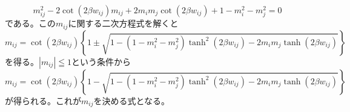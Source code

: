 \begin{equation}
m_{ij}^{2}-2\cot(2\beta w_{ij})m_{ij}+2m_{i}m_{j}\cot(2\beta
w_{ij})+1-m_{i}^2-m_{j}^{2}=0\nonumber
\end{equation}
である。この$m_{ij}$に関する二次方程式を解くと
\begin{equation}
m_{ij}=\cot(2\beta w_{ij})\left\{1\pm
\sqrt{1-(1-m_{i}^{2}-m_{j}^{2})\tanh^{2}(2\beta
w_{ij})-2m_{i}m_{j}\tanh(2\beta w_{ij})}\right\}\label{eq:4.29}
\end{equation}
を得る。$|m_{ij}|\leqq 1$という条件から
\begin{equation}
m_{ij}=\cot(2\beta w_{ij})\left\{1-
\sqrt{1-(1-m_{i}^{2}-m_{j}^{2})\tanh^{2}(2\beta
w_{ij})-2m_{i}m_{j}\tanh(2\beta w_{ij})}\right\}\label{eq:4.30}
\end{equation}
が得られる。これが$m_{ij}$を決める式となる。

